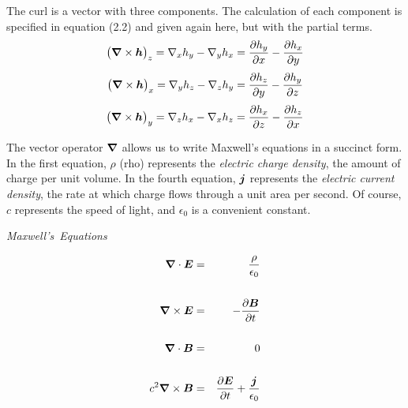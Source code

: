 The curl is a vector with three components.
The calculation of each component is specified in equation (2.2)
and given again here, but with the partial terms.
\begin{equation}
  \big( \boldsymbol{\nabla} \times \boldsymbol{h} \big)_z
  = \nabla_x h_y - \nabla_y h_x
  = \frac{\partial h_y}{\partial x} - \frac{\partial h_x}{\partial y}
\end{equation}
\begin{equation}
  \big( \boldsymbol{\nabla} \times \boldsymbol{h} \big)_x
  = \nabla_y h_z - \nabla_z h_y
  = \frac{\partial h_z}{\partial y} - \frac{\partial h_y}{\partial z}
\end{equation}
\begin{equation}
  \big( \boldsymbol{\nabla} \times \boldsymbol{h} \big)_y
  = \nabla_z h_x - \nabla_x h_z
  = \frac{\partial h_x}{\partial z} - \frac{\partial h_z}{\partial x}
\end{equation}

The vector operator $\boldsymbol{\nabla}$ allows us to write Maxwell's equations in a succinct form.
In the first equation, $\rho$ (rho) represents the \emph{electric charge density},
the amount of charge per unit volume.
In the fourth equation, $\boldsymbol{j}$ represents the \emph{electric current density},
the rate at which charge flows through a unit area per second.
Of course, $c$ represents the speed of light, and $\epsilon_0$ is a convenient constant.
\begin{center}
  \emph{Maxwell's\ Equations}
\end{center}
\begin{eqnarray}
  \boldsymbol{\nabla} \cdot \boldsymbol{E}       &=&  \frac{\rho}{\epsilon_0} \nonumber \\
  \nonumber \\
  \boldsymbol{\nabla} \times \boldsymbol{E}      &=&  - \frac{\partial \boldsymbol{B}}{\partial t} \\
  \nonumber \\
  \boldsymbol{\nabla} \cdot \boldsymbol{B}       &=&  0 \nonumber \\
  \nonumber \\
  c^2 \boldsymbol{\nabla} \times \boldsymbol{B}  &=&  \frac{\partial \boldsymbol{E}}{\partial t} + \frac{\boldsymbol{j}}{\epsilon_0} \nonumber
\end{eqnarray}



\begin{comment}

\begin{equation*}
  \grad = \Big( \nabla_x, \nabla_y, \nabla_z \Big)
  = \Bigg( \dfdx{}{x}, \dfdx{}{y}, \dfdx{}{z} \Bigg)
\end{equation*}

\begin{equation*}
  \grad' = \Big( \nabla'_x, \nabla'_y, \nabla'_z \Big)
  = \Bigg( \dfdx{}{x'}, \dfdx{}{y'}, \dfdx{}{z'} \Bigg)
\end{equation*}

\begin{equation*}
  \grad \times \bv{h} = \Big(
  \big( \grad \times \bv{h} \big)_x,
  \big( \grad \times \bv{h} \big)_y,
  \big( \grad \times \bv{h} \big)_z
  \Big)
\end{equation*}

\end{comment}
